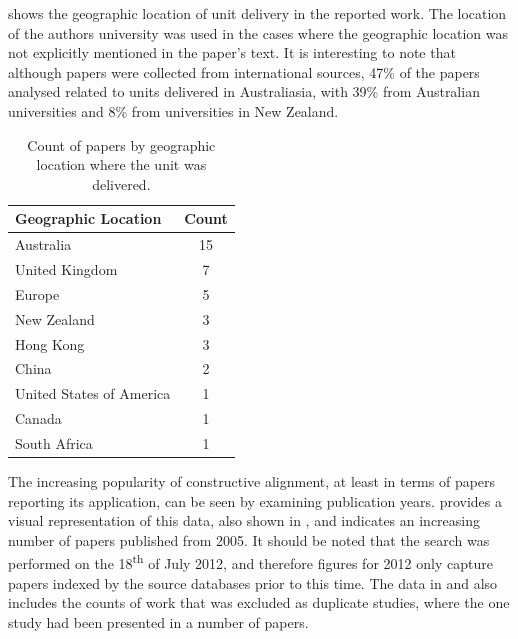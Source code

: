  shows the geographic location of unit delivery in the reported work. The location of the authors university was used in the cases where the geographic location was not explicitly mentioned in the paper's text. It is interesting to note that although papers were collected from international sources, 47\% of the papers analysed related to units delivered in Australiasia, with 39\% from Australian universities and 8\% from universities in New Zealand. 

\begin{table}[htbp]
	\centering
	\caption{Count of papers by geographic location where the unit was delivered.}
	\label{tbl:location}
	\footnotesize
    \begin{tabular}{lc}
    \textbf{Geographic Location} & \textbf{Count} \\ \hline
		Australia	 & 15 \\
		United Kingdom & 	7 \\
		Europe & 	5 \\
		New Zealand & 	3 \\
		Hong Kong & 	3 \\
		China & 	2 \\
		United States of America & 	1 \\
		Canada & 	1 \\
		South Africa & 	1 \\
    \end{tabular}
\end{table}

The increasing popularity of constructive alignment, at least in terms of papers reporting its application, can be seen by examining publication years.  provides a visual representation of this data, also shown in , and indicates an increasing number of papers published from 2005. It should be noted that the search was performed on the 18\textsuperscript{th} of July 2012, and therefore figures for 2012 only capture papers indexed by the source databases prior to this time. The data in  and  also includes the counts of work that was excluded as duplicate studies, where the one study had been presented in a number of papers.

